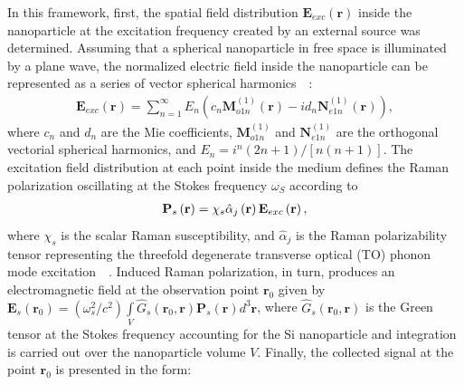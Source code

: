         In this framework, first, the spatial field distribution $\mathbf{E}_{exc}(\mathbf{r})$
        inside the nanoparticle at the excitation frequency created by an external source was determined. Assuming that a
        spherical nanoparticle in free space is illuminated by a plane wave, the normalized
        electric field inside the nanoparticle can be represented as a series of vector spherical harmonics~~\cite{bohren1983absorption}:
        \begin{align}
            \mathbf{E}_{exc}(\mathbf{r})=\sum\nolimits_{n=1}^\infty E_n \left(c_n\mathbf{M}_{o1n}^{(1)}(\mathbf{r}) -
            i{d_n}\mathbf{N}_{e1n}^{(1)}(\mathbf{r})\right) ,
            \label{eq1}
        \end{align}
        where $c_n$ and $d_n$ are the Mie coefficients, ${{\mathbf{M}}_{o1n}^{(1)}}$ and ${{\mathbf{N}}_{e1n}^{(1)}}$ are
        the orthogonal vectorial spherical harmonics, and ${E_n} = {i^n}(2n + 1)/[n(n + 1)]$. The excitation field distribution
        at each point inside the medium defines the Raman polarization oscillating at the Stokes frequency $\omega_S$ according to
        \begin{align}
            {{\bf{P}}_s}\left( {\bf{r}} \right) = {\chi _s}\hat \alpha_j \left( {\bf{r}} \right){{\bf{E}}_{exc}}\left( {\bf{r}} \right),
            \label{eq2}
        \end{align}
        where $\chi_s$ is the scalar Raman susceptibility, and $\hat \alpha_j$ is the Raman polarizability tensor representing
        the threefold degenerate transverse optical (TO) phonon mode excitation~~\cite{ralston1970spontaneous, peter2010fundamentals}.
        Induced Raman polarization, in turn, produces an electromagnetic field at the observation point
        $\mathbf{r}_0$ given by $\mathbf{E}_s(\mathbf{r}_0) = (\omega_s^2/c^2)\int\limits_V {{{\hat G}_s}\left( {{{\mathbf{r}}_0},{\mathbf{r}}} \right){{\mathbf{P}}_s}\left( {\mathbf{r}} \right){d^3}{\mathbf{r}}}$,
        where  ${\hat G_s}\left( {{{\mathbf{r}}_0},{\mathbf{r}}} \right)$ is the Green tensor at the Stokes frequency accounting
        for the Si nanoparticle and integration is carried out over the nanoparticle volume $V$. Finally, the collected signal at
        the point $\mathbf{r}_0$ is presented in the form:
